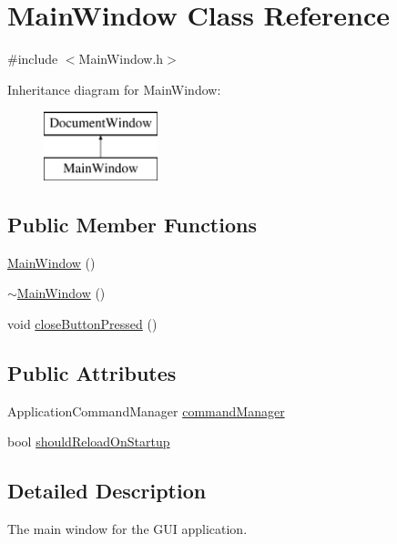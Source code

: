 \hypertarget{class_main_window}{}\section{Main\+Window Class Reference}
\label{class_main_window}


{\ttfamily \#include $<$Main\+Window.\+h$>$}

Inheritance diagram for Main\+Window\+:\begin{figure}[H]
\begin{center}
\leavevmode
\includegraphics[height=2.000000cm]{class_main_window}
\end{center}
\end{figure}
\subsection*{Public Member Functions}
\begin{DoxyCompactItemize}
\item 
\mbox{\hyperlink{class_main_window_a34c4b4207b46d11a4100c9b19f0e81bb}{Main\+Window}} ()
\item 
\mbox{\hyperlink{class_main_window_ae98d00a93bc118200eeef9f9bba1dba7}{$\sim$\+Main\+Window}} ()
\item 
void \mbox{\hyperlink{class_main_window_ac422fd3f1931a97b30d5efc8b6fc3123}{close\+Button\+Pressed}} ()
\end{DoxyCompactItemize}
\subsection*{Public Attributes}
\begin{DoxyCompactItemize}
\item 
Application\+Command\+Manager \mbox{\hyperlink{class_main_window_ae36bb0085b5650e00bca6bab107dc691}{command\+Manager}}
\item 
bool \mbox{\hyperlink{class_main_window_a1aa5cb4cc46f2ac7f90f8889f1347387}{should\+Reload\+On\+Startup}}
\end{DoxyCompactItemize}


\subsection{Detailed Description}
The main window for the G\+UI application.

